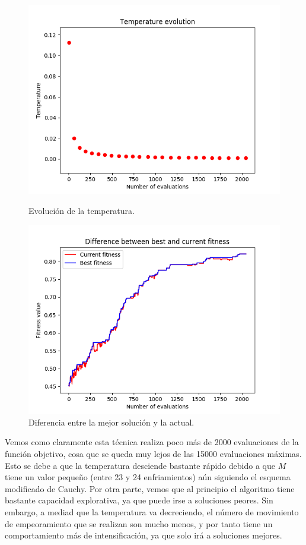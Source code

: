 \documentclass[11pt,a4paper]{article}
\begin{document}
\begin{figure}[H]
\centering
\begin{minipage}{.5\textwidth}
	\centering
	\includegraphics[scale=0.4]{img/colposcopy-sa-temp.png}
	\caption{Evolución de la temperatura.}
\end{minipage}%
\begin{minipage}{.5\textwidth}
	\centering
	\includegraphics[scale=0.4]{img/colposcopy-sa.png}
	\caption{Diferencia entre la mejor solución y la actual.}
\end{minipage}
\end{figure}

Vemos como claramente esta técnica realiza poco más de 2000 evaluaciones de la función objetivo, cosa que se queda muy lejos de las
15000 evaluaciones máximas. Esto se debe a que la temperatura desciende bastante rápido debido a que $M$ tiene un valor pequeño
(entre 23 y 24 enfriamientos) aún siguiendo el esquema modificado de Cauchy. Por otra parte, vemos que al principio el algoritmo
tiene bastante capacidad explorativa, ya que puede irse a soluciones peores. Sin embargo, a mediad que la temperatura va decreciendo,
el número de movimiento de empeoramiento que se realizan son mucho menos, y por tanto tiene un comportamiento más de intensificación,
ya que solo irá a soluciones mejores.
\end{document}
